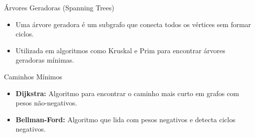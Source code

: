 \begin{frame}{Árvores Geradoras (Spanning Trees)}
  \begin{itemize}
    \item Uma árvore geradora é um subgrafo que conecta todos os vértices sem formar ciclos.
    \item Utilizada em algoritmos como Kruskal e Prim para encontrar árvores geradoras mínimas.
  \end{itemize}
\end{frame}

\begin{frame}{Caminhos Mínimos}
  \begin{itemize}
    \item \textbf{Dijkstra:} Algoritmo para encontrar o caminho mais curto em grafos com pesos não-negativos.
    \item \textbf{Bellman-Ford:} Algoritmo que lida com pesos negativos e detecta ciclos negativos.
  \end{itemize}
\end{frame}